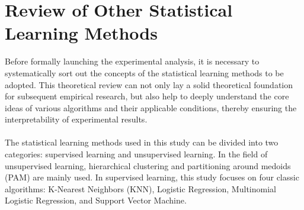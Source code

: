 \section{Review of Other Statistical Learning Methods}
Before formally launching the experimental analysis, it is necessary to systematically sort out the concepts of the statistical learning methods to be adopted. This theoretical review can not only lay a solid theoretical foundation for subsequent empirical research, but also help to deeply understand the core ideas of various algorithms and their applicable conditions, thereby ensuring the interpretability of experimental results.\\
\\
The statistical learning methods used in this study can be divided into two categories: supervised learning and unsupervised learning. In the field of unsupervised learning, hierarchical clustering and partitioning around medoids (PAM) are mainly used. In supervised learning, this study focuses on four classic algorithms: K-Nearest Neighbors (KNN), Logistic Regression, Multinomial Logistic Regression, and Support Vector Machine. \\
\\
